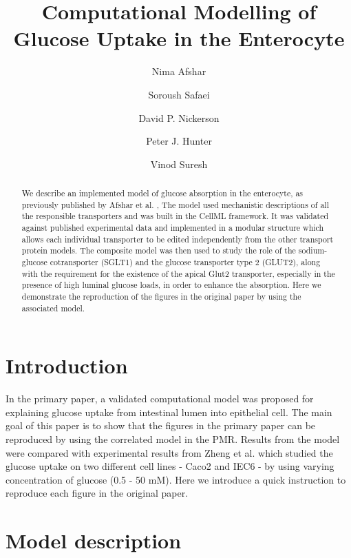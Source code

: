 \documentclass[fleqn,10pt]{physiome}
\title{Computational Modelling of Glucose Uptake in the Enterocyte}
\author[1][nima.afshar@auckland.ac.nz]{Nima Afshar}
\author[1]{Soroush Safaei}
\author[1]{David P. Nickerson}
\author[1]{Peter J. Hunter}
\author[1,2]{Vinod Suresh}
\affil[1]{Auckland Bioengineering Institute, University of Auckland,New Zealand}
\affil[2]{Department of Engineering Science, University of Auckland,New Zealand}
\begin{document}
\maketitle

\begin{abstract}
We describe an implemented model of glucose absorption in the enterocyte, as previously published by Afshar et al. \cite{afshar2019computational}, The model used mechanistic descriptions of all the responsible transporters and was built in the CellML framework. It was validated against published experimental data and implemented in a modular structure which allows each individual transporter to be edited independently from the other transport protein models. The composite model was then used to study the role of the sodium-glucose
cotransporter (SGLT1) and the glucose transporter type 2 (GLUT2), along with the requirement for the existence of the apical Glut2 transporter, especially in the presence of high luminal glucose loads, in order to enhance the absorption. Here we demonstrate the reproduction of the figures in the original paper by using the associated model.
\end{abstract}



\section{Introduction}

In the primary paper, a validated computational model was proposed for explaining glucose uptake from intestinal lumen into epithelial cell. The main goal of this paper is to show that the figures in the primary paper can be reproduced by using the correlated model in the PMR. Results from the model were compared with experimental results from Zheng et al. \citep{zheng2012mechanisms} which studied the glucose uptake on two different cell lines - Caco2 and IEC6 - by using varying concentration of glucose (0.5 - 50 mM).
Here we introduce a quick instruction to reproduce each figure in the original paper. 

\section{Model description}
\end{document}
